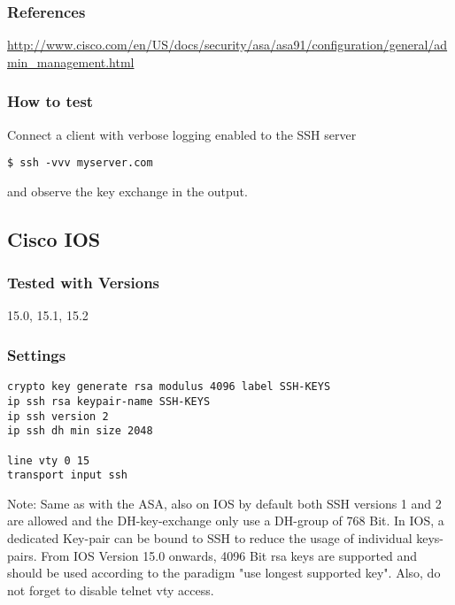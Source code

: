 \subsubsection{References}
\begin{itemize*}
  \item \url{http://www.cisco.com/en/US/docs/security/asa/asa91/configuration/general/admin\_management.html }
\end{itemize*}

\subsubsection{How to test}
Connect a client with verbose logging enabled to the SSH server
\begin{lstlisting}
$ ssh -vvv myserver.com
\end{lstlisting}and observe the key exchange in the output.


\subsection{Cisco IOS}
\subsubsection{Tested with Versions}
\begin{itemize*}
  \item 15.0, 15.1, 15.2
\end{itemize*}


\subsubsection{Settings}
\begin{lstlisting}
crypto key generate rsa modulus 4096 label SSH-KEYS
ip ssh rsa keypair-name SSH-KEYS
ip ssh version 2
ip ssh dh min size 2048

line vty 0 15
transport input ssh
\end{lstlisting}
Note: Same as with the ASA, also on IOS by default both SSH versions 1 and 2 are allowed and the DH-key-exchange only use a DH-group of 768 Bit.
In IOS, a dedicated Key-pair can be bound to SSH to reduce the usage of individual keys-pairs.
From IOS Version 15.0 onwards, 4096 Bit rsa keys are supported and should be used according to the paradigm "use longest supported key". Also, do not forget to disable telnet vty access.


